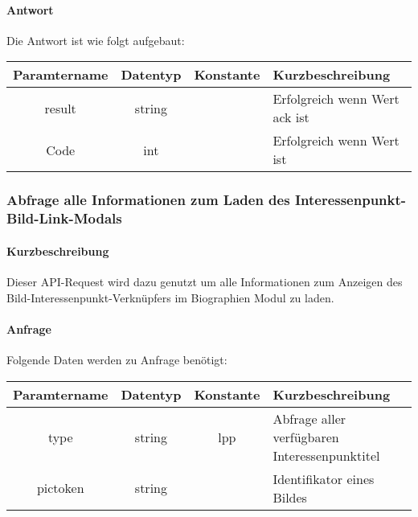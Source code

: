 \paragraph{Antwort}Die Antwort ist wie folgt aufgebaut:
\begin{table}[H]
	\begin{tabular}{|c|c|c|p{6.5cm}|}
		\hline
		\textbf{Paramtername} & \textbf{Datentyp} & \textbf{Konstante} & \textbf{Kurzbeschreibung}                                                                                               \\ \hline
		result              & string           &                 & Erfolgreich wenn Wert {\glqq ack\grqq} ist \\ \hline
		Code                & int              &                 & Erfolgreich wenn Wert {\glqq 0\grqq} ist \\ \hline
	\end{tabular}
\end{table}
\subsubsection{Abfrage alle Informationen zum Laden des Interessenpunkt-Bild-Link-Modals}
\paragraph{Kurzbeschreibung}Dieser API-Request wird dazu genutzt um alle Informationen zum Anzeigen des Bild-Interessenpunkt-Verknüpfers im Biographien Modul zu laden.
\paragraph{Anfrage}Folgende Daten werden zu Anfrage benötigt:
\begin{table}[H]
	\begin{tabular}{|c|c|c|p{6.5cm}|}
		\hline
		\textbf{Paramtername} & \textbf{Datentyp} & \textbf{Konstante} & \textbf{Kurzbeschreibung}                                                                                               \\ \hline
		type                & string            & lpp                & Abfrage aller verfügbaren Interessenpunktitel \\ \hline
		pictoken            & string            &                    & Identifikator eines Bildes \\ \hline
	\end{tabular}
\end{table}
